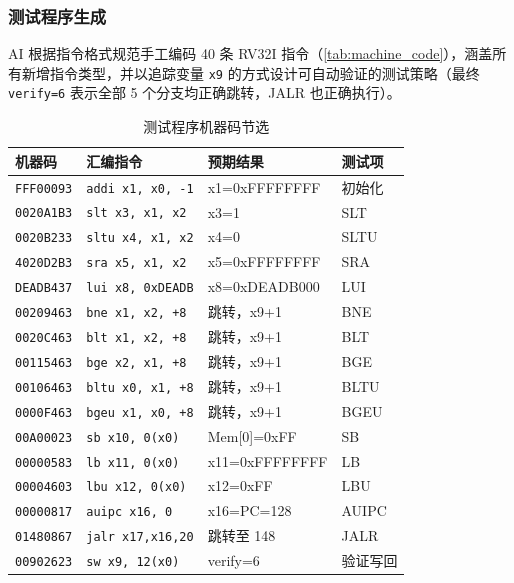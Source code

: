 \documentclass[12pt,hyperref,a4paper,UTF8]{ctexart}
\begin{document}
\subsubsection{测试程序生成}

AI 根据指令格式规范手工编码 40 条 RV32I 指令（\autoref{tab:machine_code}），涵盖所有新增指令类型，并以追踪变量 \texttt{x9} 的方式设计可自动验证的测试策略（最终 \texttt{verify=6} 表示全部 5 个分支均正确跳转，JALR 也正确执行）。

\begin{table}[H]
    \centering
    \caption{测试程序机器码节选}
    \label{tab:machine_code}
    \begin{tabular}{llll}
        \toprule
        机器码 & 汇编指令 & 预期结果 & 测试项 \\
        \midrule
        \texttt{FFF00093} & \texttt{addi x1, x0, -1}  & x1=0xFFFFFFFF & 初始化 \\
        \texttt{0020A1B3} & \texttt{slt x3, x1, x2}   & x3=1          & SLT \\
        \texttt{0020B233} & \texttt{sltu x4, x1, x2}  & x4=0          & SLTU \\
        \texttt{4020D2B3} & \texttt{sra x5, x1, x2}   & x5=0xFFFFFFFF & SRA \\
        \texttt{DEADB437} & \texttt{lui x8, 0xDEADB}  & x8=0xDEADB000 & LUI \\
        \texttt{00209463} & \texttt{bne x1, x2, +8}   & 跳转，x9+1   & BNE \\
        \texttt{0020C463} & \texttt{blt x1, x2, +8}   & 跳转，x9+1   & BLT \\
        \texttt{00115463} & \texttt{bge x2, x1, +8}   & 跳转，x9+1   & BGE \\
        \texttt{00106463} & \texttt{bltu x0, x1, +8}  & 跳转，x9+1   & BLTU \\
        \texttt{0000F463} & \texttt{bgeu x1, x0, +8}  & 跳转，x9+1   & BGEU \\
        \texttt{00A00023} & \texttt{sb x10, 0(x0)}    & Mem[0]=0xFF   & SB \\
        \texttt{00000583} & \texttt{lb x11, 0(x0)}    & x11=0xFFFFFFFF& LB \\
        \texttt{00004603} & \texttt{lbu x12, 0(x0)}   & x12=0xFF      & LBU \\
        \texttt{00000817} & \texttt{auipc x16, 0}     & x16=PC=128    & AUIPC \\
        \texttt{01480867} & \texttt{jalr x17,x16,20}  & 跳转至 148    & JALR \\
        \texttt{00902623} & \texttt{sw x9, 12(x0)}    & verify=6      & 验证写回 \\
        \bottomrule
    \end{tabular}
\end{table}
\end{document}
